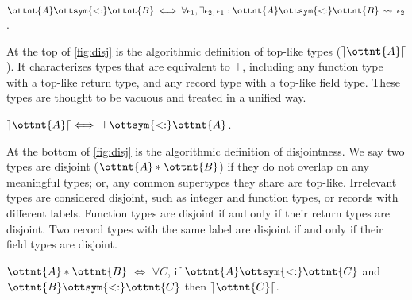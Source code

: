 \begin{theorem}
  $ \ottnt{A}   \ottsym{<:}   \ottnt{B}  \iff \forall \epsilon_{{\mathrm{1}}}, \exists \epsilon_{{\mathrm{2}}}, \epsilon_{{\mathrm{1}}}  :  \ottnt{A}  \ottsym{<:}  \ottnt{B}  \,\rightsquigarrow\,  \epsilon_{{\mathrm{2}}}$.
\end{theorem}

At the top of \autoref{fig:disj} is the algorithmic definition of top-like types
($ \rceil \ottnt{A} \lceil $). It characterizes types that are equivalent to $ \top $,
including any function type with a top-like return type, and any record type
with a top-like field type. These types are thought to be vacuous and treated in
a unified way.

\begin{theorem}
  $ \rceil \ottnt{A} \lceil  \iff   \top    \ottsym{<:}   \ottnt{A} $.
\end{theorem}

At the bottom of \autoref{fig:disj} is the algorithmic definition of
disjointness. We say two types are disjoint ($\ottnt{A}  *  \ottnt{B}$) if they do not overlap
on any meaningful types; or, any common supertypes they share are top-like.
Irrelevant types are considered disjoint, such as integer and function types, or
records with different labels. Function types are disjoint if and only if their
return types are disjoint. Two record types with the same label are disjoint if
and only if their field types are disjoint.

\begin{theorem}\label{thm:disjoint}
  $\ottnt{A}  *  \ottnt{B}$ $\iff$
  $\forall C$, if $ \ottnt{A}   \ottsym{<:}   \ottnt{C} $ and $ \ottnt{B}   \ottsym{<:}   \ottnt{C} $ then $ \rceil \ottnt{C} \lceil $.
\end{theorem}

